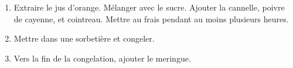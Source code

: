 
\begin{ingredients}
\end{ingredients}


\begin{recipe}
  \begin{enumerate}

  \item Extraire le jus d'orange.  Mélanger avec le sucre.  Ajouter la
    cannelle, poivre de cayenne, et cointreau.  Mettre au frais
    pendant au moins plusieurs heures.

  \item Mettre dans une sorbetière et congeler.

  \item Vers la fin de la congelation, ajouter le meringue.

  \end{enumerate}
\end{recipe}

